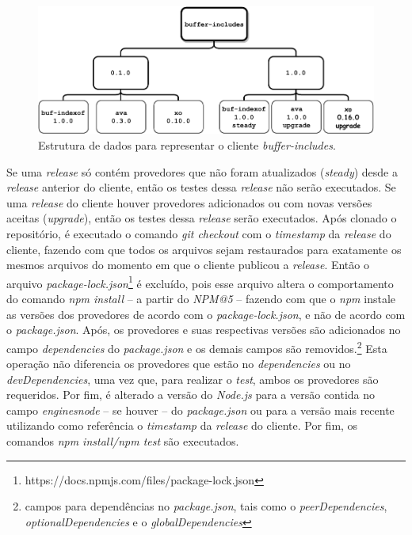 \begin{figure}
    \centering
    \includegraphics[scale=0.9]{figuras/bcdetect_work.pdf}
    \caption{Estrutura de dados para representar o cliente \textit{buffer-includes}.}
    \label{fig:bc_work}
\end{figure}{}

Se uma \textit{release} só contém provedores que não foram atualizados (\textit{steady}) desde a \textit{release} anterior do cliente, então os testes dessa \textit{release} não serão executados. Se uma \textit{release} do cliente houver provedores adicionados ou com novas versões aceitas (\textit{upgrade}), então os testes dessa \textit{release} serão executados. Após clonado o repositório, é executado o comando \textit{git checkout} com o \textit{timestamp} da \textit{release} do cliente, fazendo com que todos os arquivos sejam restaurados para exatamente os mesmos arquivos do momento em que o cliente publicou a \textit{release}. Então o arquivo \textit{package-lock.json}\footnote{https://docs.npmjs.com/files/package-lock.json} é excluído, pois esse arquivo altera o comportamento do comando \textit{npm install} -- a partir do \textit{NPM@5} -- fazendo com que o \textit{npm} instale as versões dos provedores de acordo com o \textit{package-lock.json}, e não de acordo com o \textit{package.json}. Após, os provedores e suas respectivas versões são adicionados no campo \textit{dependencies} do \textit{package.json} e os demais campos são removidos.\footnote{campos para dependências no \textit{package.json}, tais como o \textit{peerDependencies}, \textit{optionalDependencies} e o \textit{globalDependencies}} Esta operação não diferencia os provedores que estão no \textit{dependencies} ou no \textit{devDependencies}, uma vez que, para realizar o \textit{test}, ambos os provedores são requeridos. Por fim, é alterado a versão do \textit{Node.js} para a versão contida no campo \textit{engines\textrightarrow node} -- se houver -- do \textit{package.json} ou para a versão mais recente utilizando como referência o \textit{timestamp} da \textit{release} do cliente. Por fim, os comandos \textit{npm install/npm test} são executados.

